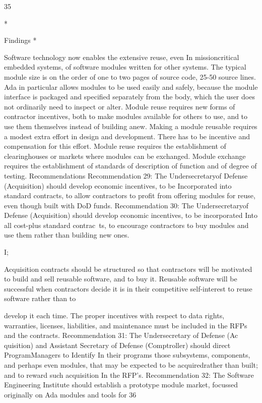 \documentclass[12pt]{article}
\begin{document}
35

*

Findings
*

Software technology now enables the extensive reuse, even In missioncritical embedded systems, of software modules written for other systems.
The typical module size is on the order of one to two pages of source code, 25-50
source lines. Ada in particular allows modules to be used easily and safely, because the
module interface is packaged and specified separately from the body, which the user does
not ordinarily need to inspect or alter.
Module reuse requires new forms of contractor incentives, both to make
modules available for others to use, and to use them themselves instead of
building anew. Making a module reusable requires a modest extra effort in design and
development. There has to be incentive and compensation for this effort.
Module reuse requires the establishment of clearinghouses or markets where
modules can be exchanged.
Module exchange requires the establishment of standards of description of
function and of degree of testing.
Recommendations
Recommendation 29: The Undersecretaryof Defense (Acquisition) should
develop economic incentives, to be Incorporated into standard contracts, to
allow contractors to profit from offering modules for reuse, even though built
with DoD funds.
Recommendation 30: The Undersecretaryof Defense (Acquisition) should
develop economic incentives, to be incorporated Into all cost-plus standard
contrac~ts, to encourage contractors to buy modules and use them rather than
building new ones.

I;

Acquisition contracts should be structured so that contractors will be motivated to
build and sell reusable software, and to buy it. Reusable software will be successful when
contractors decide it is in their competitive self-interest to reuse software rather than to

develop it each time. The proper incentives with respect to data rights, warranties, licenses,
liabilities, and maintenance must be included in the RFPs and the contracts.
Recommendation 31: The Undersecretary of Defense (Ac quisition) and
Assistant Secretary of Defense (Comptroller) should direct ProgramManagers
to Identify In their programs those subsystems, components, and perhaps even
modules, that may be expected to be acquiredrather than built; and to reward
such acquisition In the RFP's.
Recommendation 32: The Software Engineering Institute should establish
a prototype module market, focussed originally on Ada modules and tools for
36
\end{document}
